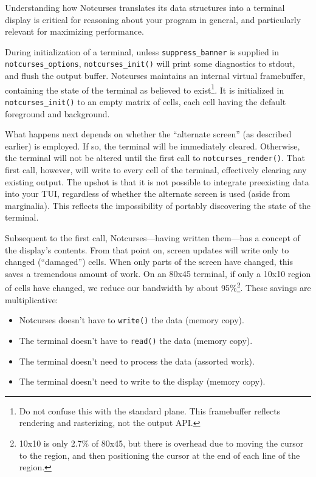 \documentclass[letterpaper,10pt]{article}
\newenvironment{denseitemize}{
  \begin{itemize}
      \setlength{\itemsep}{0pt}
}{
  \end{itemize}
}
\begin{document}
Understanding how Notcurses translates its data structures into a terminal
display is critical for reasoning about your program in general, and particularly
relevant for maximizing performance.

During initialization of a terminal, unless \texttt{suppress\_banner} is supplied
in \texttt{notcurses\_options}, \texttt{notcurses\_init()} will print some
diagnostics to stdout, and flush the output buffer. Notcurses maintains an
internal virtual framebuffer, containing the state of the terminal as believed
to exist\footnote{Do not confuse this with the standard plane. This framebuffer
reflects rendering and rasterizing, not the output API.}. It is initialized in
\texttt{notcurses\_init()} to an empty matrix of cells, each cell having the
default foreground and background.

What happens next depends on whether the ``alternate screen'' (as described
earlier) is employed. If so, the terminal will be immediately cleared.
Otherwise, the terminal will not be altered until the first call to
\texttt{notcurses\_render()}. That first call, however, will write to every
cell of the terminal, effectively clearing any existing output. The upshot is
that it is not possible to integrate preexisting data into your TUI, regardless
of whether the alternate screen is used (aside from marginalia). This reflects
the impossibility of portably discovering the state of the terminal.

Subsequent to the first call, Notcurses---having written them---has a concept
of the display's contents. From that point on, screen updates will write only
to changed (``damaged'') cells. When only parts of the screen have changed,
this saves a tremendous amount of work. On an 80x45 terminal, if only a 10x10
region of cells have changed, we reduce our bandwidth by about
95\%\footnote{10x10 is only 2.7\% of 80x45, but there is overhead due to moving
the cursor to the region, and then positioning the cursor at the end of each
line of the region.}. These savings are multiplicative:

\begin{denseitemize}
\item{Notcurses doesn't have to \texttt{write()} the data (memory copy).}
\item{The terminal doesn't have to \texttt{read()} the data (memory copy).}
\item{The terminal doesn't need to process the data (assorted work).}
\item{The terminal doesn't need to write to the display (memory copy).}
\end{denseitemize}
\end{document}
